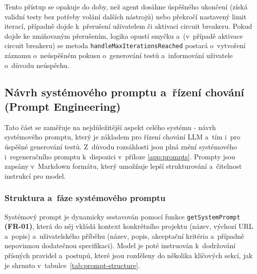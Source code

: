 \documentclass[czech, ing, kiv, he, iso690numb, viewonly]{fasthesis}
\begin{document}
Tento přístup se opakuje do doby, než agent dosáhne úspěšného ukončení (získá validní testy bez potřeby volání dalších nástrojů) 
nebo překročí nastavený limit iterací, případně dojde k~přerušení uživatelem či aktivaci circuit breakeru. Pokud dojde ke zmiňovaným 
přerušením, logika opustí smyčku a~(v~případě aktivace circuit breakeru) se metoda \texttt{handleMaxIterationsReached} postará o~vytvoření 
záznamu o~neúspěšném pokusu o~generování testů a~informování uživatele o~důvodu neúspěchu.

\subsection{Návrh systémového promptu a~řízení chování (Prompt Engineering)}
Tato část se zaměřuje na nejdůležitější aspekt celého systému - návrh systémového promptu, 
který je základem pro řízení chování LLM a~tím i~pro úspěšné generování testů.
Z~důvodu rozsáhlosti jsou plná znění systémového i~regeneračního promptu k~dispozici v~příloze \ref{app:prompts}. 
Prompty jsou zapsány v~Markdown formátu, který umožňuje lepší strukturování a~čitelnost instrukcí pro model.


\subsubsection*{Struktura a~fáze systémového promptu}
Systémový prompt je dynamicky sestavován pomocí funkce \texttt{getSystemPrompt} \textbf{(FR-01)}, která do
něj vkládá kontext konkrétního projektu (název, výchozí URL a~popis) a~uživatelského příběhu (název, popis, akceptační kritéria a~případně 
nepovinnou dodatečnou specifikaci). Model je poté instruován k~dodržování přísných pravidel a~postupů, 
které jsou rozděleny do několika klíčových sekcí, jak je shrnuto v~tabulce~\ref{tab:prompt-structure}.
\end{document}
